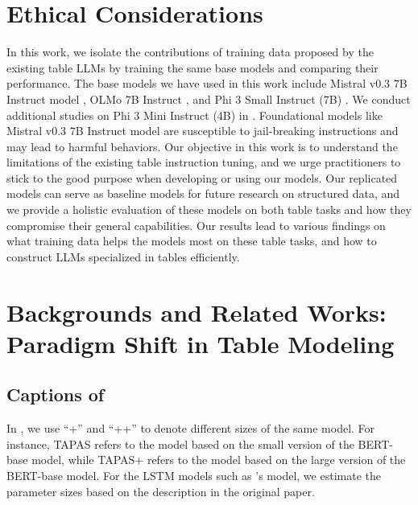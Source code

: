 \documentclass[11pt]{article}
\begin{document}
\section*{Ethical Considerations}
In this work, we isolate the contributions of training data proposed by the existing table LLMs by training the same base models and comparing their performance.
The base models we have used in this work include Mistral v0.3 7B Instruct model \citep{jiang2023mistral}, OLMo 7B Instruct \citep{groeneveld2024olmo}, and Phi 3 Small Instruct (7B) \citep{abdin2024phi}.
We conduct additional studies on Phi 3 Mini Instruct (4B) in .
Foundational models like Mistral v0.3 7B Instruct model are susceptible to jail-breaking instructions \citep{wei2024jailbroken} and may lead to harmful behaviors.
Our objective in this work is to understand the limitations of the existing table instruction tuning, and we urge practitioners to stick to the good purpose when developing or using our models.
Our replicated models can serve as baseline models for future research on structured data, and we provide a holistic evaluation of these models on both table tasks and how they compromise their general capabilities.
Our results lead to various findings on what training data helps the models most on these table tasks, and how to construct LLMs specialized in tables efficiently.




\newpage
\appendix
\newpage

\section{Backgrounds and Related Works: Paradigm Shift in Table Modeling}
\label{app-sec: table-modeling-history}

\subsection{Captions of }
\label{app-subsec: table-model-history-fig-explain}
In , we use ``+'' and ``++'' to denote different sizes of the same model. 
For instance, TAPAS \citep{herzig-etal-2020-tapas} refers to the model based on the small version of the BERT-base model, while TAPAS+ refers to the model based on the large version of the BERT-base model.
For the LSTM models such as \citet{liu2018table}'s model, we estimate the parameter sizes based on the description in the original paper.
\end{document}
